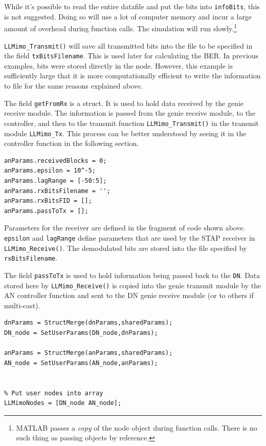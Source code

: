While it's possible to read the entire datafile and put the bits
into \verb+infoBits+, this is not suggested.  Doing so will use a
lot of computer memory and incur a large amount of overhead during
function calls. The simulation will run slowly.\footnote{MATLAB
passes a \emph{copy} of the node object during function calls. There
is no such thing as passing objects by reference.}

\verb+LLMimo_Transmit()+ will save all transmitted bits into the
file to be specified in the field \verb+txBitsFilename+.  This is
used later for calculating the BER.  In previous examples, bits were
stored directly in the node.  However, this example is sufficiently
large that it is more computationally efficient to write the
information to file for the same reasons explained above.

The field \verb+getFromRx+ is a struct.  It is used to hold data
received by the genie receive module.  The information is passed
from the genie receive module, to the controller, and then to the
transmit function \verb+LLMimo_Transmit()+ in the transmit module
\verb+LLMimo_Tx+.  This process can be better understood by seeing
it in the controller function in the following section.

\begin{lstlisting}[name=llmimoBuild]
% AN-specific (Receiver) parameters
anParams.receivedBlocks = 0;
anParams.epsilon = 10^-5;
anParams.lagRange = [-50:5];
anParams.rxBitsFilename = '';
anParams.rxBitsFID = [];
anParams.passToTx = [];

\end{lstlisting}

Parameters for the receiver are defined in the fragment of code
shown above.  \verb+epsilon+ and \verb+lagRange+ define parameters
that are used by the STAP receiver in \verb+LLMimo_Receive()+.  The
demodulated bits are stored into the file specified by
\verb+rxBitsFilename+.

The field \verb+passToTx+ is used to hold information being passed
back to the \verb+DN+.  Data stored here by \verb+LLMimo_Receive()+
is copied into the genie transmit module by the AN controller
function and sent to the DN genie receive module (or to others if multi-cast).

\begin{lstlisting}[name=llmimoBuild]
% Save parameters within nodes
dnParams = StructMerge(dnParams,sharedParams);
DN_node = SetUserParams(DN_node,dnParams);

anParams = StructMerge(anParams,sharedParams);
AN_node = SetUserParams(AN_node,anParams);


% Put user nodes into array
LLMimoNodes = [DN_node AN_node];
\end{lstlisting}

